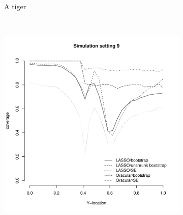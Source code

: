 \documentclass[authoryear, review, 11pt]{elsarticle}
\begin{document}
\begin{figure}
\begin{subfigure}[b]{0.3\textwidth}
			\caption{A tiger}
			\label{fig:tiger}
		\end{subfigure}
        ~ %
		\begin{subfigure}[b]{0.3\textwidth}
			\centering
			\includegraphics[width=\textwidth]{../../figures/simulation/28-9-profile-coverage.pdf}
			\label{fig:mouse}
		\end{subfigure}
	\end{figure}
\end{document}

